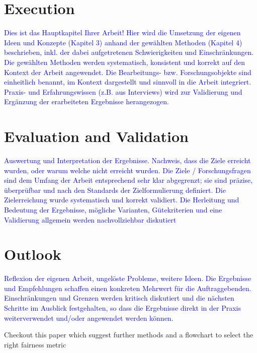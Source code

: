 \documentclass[12pt, a4paper, oneside]{book}   	%
\newcommand{\baaCriteria}[1]{\textcolor{blue}{#1}}
\begin{document}
		
		
		
		
	\chapter{Execution}
		\baaCriteria{Dies ist das Hauptkapitel Ihrer Arbeit! Hier wird die Umsetzung der eigenen Ideen und Konzepte (Kapitel 3) anhand der gewählten Methoden (Kapitel 4) beschrieben, inkl. der dabei aufgetretenen Schwierigkeiten und Einschränkungen.}
		\baaCriteria{Die gewählten Methoden werden systematisch, konsistent und korrekt auf den Kontext der Arbeit angewendet. Die Bearbeitungs- bzw. Forschungsobjekte sind einheitlich benannt, im Kontext dargestellt und sinnvoll in die Arbeit integriert. Praxis- und Erfahrungswissen (z.B. aus Interviews) wird zur Validierung und Ergänzung der erarbeiteten Ergebnisse herangezogen. }


	\chapter{Evaluation and Validation}
		\baaCriteria{Auswertung und Interpretation der Ergebnisse. Nachweis, dass die Ziele erreicht wurden, oder warum	welche nicht erreicht wurden.}
		\baaCriteria{Die Ziele / Forschungsfragen sind dem Umfang der Arbeit entsprechend sehr klar abgegrenzt; sie sind präzise, überprüfbar und nach den Standards der Zielformulierung definiert. Die Zielerreichung wurde systematisch und korrekt validiert.}
		\baaCriteria{Die Herleitung und Bedeutung der Ergebnisse, mögliche Varianten, Gütekriterien und eine Validierung allgemein werden nachvollziehbar diskutiert}
	
	\chapter{Outlook}
		\baaCriteria{Reflexion der eigenen Arbeit, ungelöste Probleme, weitere Ideen.}
		\baaCriteria{Die Ergebnisse und Empfehlungen schaffen einen konkreten Mehrwert für die Auftraggebenden. Einschränkungen und Grenzen werden kritisch diskutiert und die nächsten Schritte im Ausblick festgehalten, so dass die Ergebnisse direkt in der Praxis weiterverwendet und/oder angewendet werden können.}
		
		
		Checkout this paper which suggest further methods and a flowchart to select the right fairness metric \textcite{Barr_2025}
		
		\newpage
\end{document}
